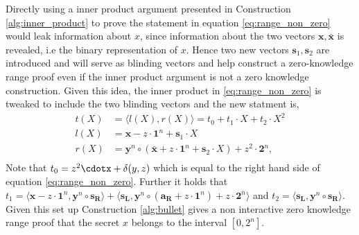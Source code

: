 Directly using  a inner product argument presented in Construction \ref{alg:inner_product} to prove the statement  in equation \eqref{eq:range_non_zero} would leak information about $x$, since information about the two vectors $\bm{x},\bm{\bar{x}}$ is revealed, i.e the binary representation of $x$. Hence two new vectors $\bm{s}_1,\bm{s}_2$ are introduced and will serve as blinding vectors and help construct a zero-knowledge range proof even if the inner product argument is not a zero knowledge construction. Given this idea, the inner product in \eqref{eq:range_non_zero} is tweaked to include the two blinding vectors and the new statment is,
\begin{align*}
     t(X) &= \langle  l(X),r(X)\rangle = t_0 + t_1\cdot X + t_2\cdot X^2\\
    l(X) &= \bm{x} -z\cdot \bm{1}^n +\bm{s}_1\cdot X\\
    r(X) &= \bm{y}^n\circ (\bm{\bar{x}} + z \cdot\bm{1}^n + \bm{s}_2\cdot X)+ z^2\cdot\bm{2}^n,\\
\end{align*}
Note that $t_0 = z^2\cdotx + \delta(y,z)$ which is equal to the right hand side of equation \eqref{eq:range_non_zero}. Further it holds that $t_1 = \langle \bm{x}-z\cdot \bm{1}^n , \bm{y}^n\circ \bm{s_R}\rangle + \langle\bm{s_L},\bm{y}^n\circ (\bm{a_R}+z\cdot\bm{1}^n) + z\cdot \bm{2}^n\rangle$ and $t_2 =\langle \bm{s_L}, \bm{y}^n \circ \bm{s_R}\rangle $. Given this set up Construction \ref{alg:bullet} gives a non interactive zero knowledge range proof that the secret $x$ belongs to the interval $[0,2^n]$.

